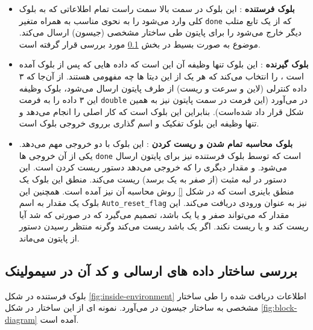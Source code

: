    \begin{itemize}
   		\item \textbf{بلوک فرستنده} :
   		این بلوک در سمت بالا سمت راست تمام اطلاعاتی که به بلوک کلی 
   		وارد می‌شود را به نحوی مناسب به همراه متغیر \texttt{done} که از یک تابع متلب دیگر خارج می‌شود را برای پایتون طی ساختار مشخصی (جیسون) ارسال می‌کند. موضوع به صورت بسیط در بخش
   		\ref{ch:fani|sec:simulink|sub:json}
   		مورد بررسی قرار گرفته است.
   		\item \textbf{بلوک گیرنده} :
   		این بلوک تنها وظیفه آن این است که داده هایی که پس از بلوک  آمده است ، را انتخاب می‌کند که هر یک از این دیتا ها چه مفهومی هستند. از آن‌جا که ۳ داده کنترلی (لاین و سرعت و ریست) از طرف پایتون ارسال می‌شود، بلوک  وظیفه این ۳ داده را به فرمت \texttt{double} در می‌آورد (این فرمت در سمت پایتون نیز به همین شکل قرار داد شده‌است). بنابراین این بلوک  است که کار اصلی را انجام می‌دهد و تنها وظیفه این بلوک تفکیک و اسم گذاری بر‌روی خروجی بلوک  است.
   
   		\item \textbf{بلوک محاسبه تمام شدن و ریست کردن} :
   		این بلوک با دو خروجی مهم می‌دهد. یکی از آن خروجی ها \texttt{done} است که توسط بلوک فرستنده نیز برای پایتون ارسال می‌شود. و مقدار دیگری را که خروجی می‌دهد دستور ریست کردن است. این دستور در لبه مثبت (از صفر به یک برسد) ریست می‌کند. منطق این بلوک یک منطق باینری است که در شکل 
   		\ref{}
   		روش محاسبه آن نیز آمده است. 
   		همچنین این بلوک یک مقدار به اسم \texttt{Auto\_reset\_flag} نیز به عنوان ورودی دریافت می‌کند. این مقدار که می‌تواند صفر و یا یک باشد، تصمیم می‌گیرد که در صورتی که  شد آیا ریست کند و یا ریست نکند. اگر یک باشد ریست می‌کند وگرنه منتظر رسیدن دستور از پایتون می‌ماند.
   		
   \end{itemize}
   
\subsection{بررسی ساختار داده های ارسالی  و کد آن در سیمولینک}\label{ch:fani|sec:simulink|sub:json}
   
   بلوک فرستنده در شکل
   \ref{fig:inside-environment}
   اطلاعات دریافت شده را طی ساختار مشخصی به ساختار جیسون در می‌آورد.
   نمونه ای از این ساختار در شکل
   \ref{fig:block-diagram}
    آمده است.
   
